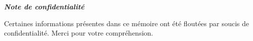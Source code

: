 \thispagestyle{empty}
\vspace*{2cm}
\begin{center}
    \huge{\textbf{\textit{Note de confidentialité}}}
\end{center}
\bigskip
\medskip
\vspace{2cm}
\begin{center}
    \large{
        Certaines informations présentes dans ce mémoire ont été floutées par soucis de confidentialité. Merci pour votre compréhension.
    }
\end{center}

\clearpage